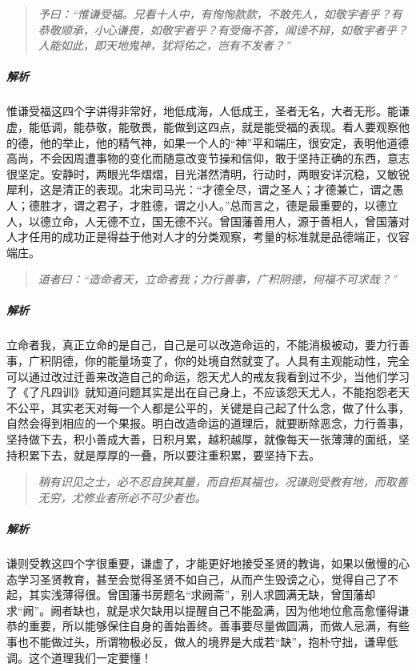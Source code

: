 \begin{quote}\it
    予曰：“惟谦受福。兄看十人中，有恂恂款款，不敢先人，如敬宇者乎？有恭敬顺承，小心谦畏，如敬宇者乎？有受侮不答，闻谤不辩，如敬宇者乎？人能如此，即天地鬼神，犹将佑之，岂有不发者？”
\end{quote}

\subparagraph{解析} 惟谦受福这四个字讲得非常好，地低成海，人低成王，圣者无名，大者无形。能谦虚，能低调，能恭敬，能敬畏，能做到这四点，就是能受福的表现。看人要观察他的德，他的举止，他的精气神，如果一个人的“神”平和端庄，很安定，表明他道德高尚，不会因周遭事物的变化而随意改变节操和信仰，敢于坚持正确的东西，意志很坚定。安静时，两眼光华熠熠，目光湛然清明，行动时，两眼安详沉稳，又敏锐犀利，这是清正的表现。北宋司马光：“才德全尽，谓之圣人；才德兼亡，谓之愚人；德胜才，谓之君子，才胜德，谓之小人。”总而言之，德是最重要的，以德立人，以德立命，人无德不立，国无德不兴。曾国藩善用人，源于善相人，曾国藩对人才任用的成功正是得益于他对人才的分类观察，考量的标准就是品德端正，仪容端庄。

\begin{quote}\it
    道者曰：“造命者天，立命者我；力行善事，广积阴德，何福不可求哉？”
\end{quote}

\subparagraph{解析} 立命者我，真正立命的是自己，自己是可以改造命运的，不能消极被动，要力行善事，广积阴德，你的能量场变了，你的处境自然就变了。人具有主观能动性，完全可以通过改过迁善来改造自己的命运，怨天尤人的戒友我看到过不少，当他们学习了《了凡四训》就知道问题其实是出在自己身上，不应该怨天尤人，不能抱怨老天不公平，其实老天对每一个人都是公平的，关键是自己起了什么念，做了什么事，自然会得到相应的一个果报。明白改造命运的道理后，就要断除恶念，力行善事，坚持做下去，积小善成大善，日积月累，越积越厚，就像每天一张薄薄的面纸，坚持积累下去，就是厚厚的一叠，所以要注重积累，要坚持下去。

\begin{quote}\it
    稍有识见之士，必不忍自狭其量，而自拒其福也，况谦则受教有地，而取善无穷，尤修业者所必不可少者也。
\end{quote}

\subparagraph{解析} 谦则受教这四个字很重要，谦虚了，才能更好地接受圣贤的教诲，如果以傲慢的心态学习圣贤教育，甚至会觉得圣贤不如自己，从而产生毁谤之心，觉得自己了不起，其实浅薄得很。曾国藩书房题名“求阙斋”，别人求圆满无缺，曾国藩却求“阙”。阙者缺也，就是求欠缺用以提醒自己不能盈满，因为他地位愈高愈懂得谦恭的重要，所以能够保住自身的善始善终。善事要尽量做圆满，而做人忌满，有些事也不能做过头，所谓物极必反，做人的境界是大成若“缺”，抱朴守拙，谦卑低调。这个道理我们一定要懂！

